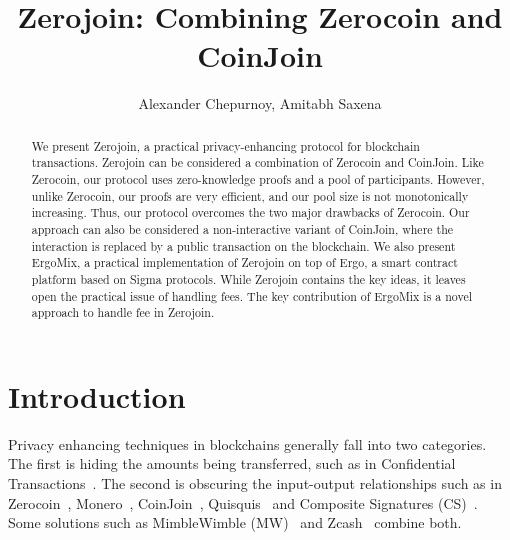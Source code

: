 \documentclass[runningheads]{llncs}
\newcommand{\mixname}{ErgoMix\xspace}
\newcommand{\zerocoin}{Zerocoin\xspace}
\begin{document}
\newcommand{\algname}{Zerojoin\xspace}
\title{\algname: Combining \zerocoin and CoinJoin}

\author{Alexander Chepurnoy, Amitabh Saxena}


\maketitle

\begin{abstract}

We present \algname, a practical privacy-enhancing protocol for blockchain transactions. \algname can be considered a combination of \zerocoin and CoinJoin. 
Like \zerocoin, our protocol uses zero-knowledge proofs and a pool of
participants. However, unlike \zerocoin, our proofs are very efficient, and our pool size is not monotonically increasing.
Thus, our protocol overcomes the two major drawbacks of \zerocoin. Our approach can also be considered a non-interactive variant of CoinJoin, where the interaction is replaced by a public transaction on the blockchain. We also present \mixname, a practical implementation of \algname on top of Ergo, a smart contract platform based on Sigma protocols. While \algname contains the key ideas, it leaves open the practical issue of handling fees. The key contribution of \mixname is a novel approach to handle fee in \algname. 

\end{abstract}

\section{Introduction}
\label{intro}

Privacy enhancing techniques in blockchains generally fall into two categories. The first is hiding the amounts being transferred, such as in Confidential Transactions~\cite{ct}. The second is obscuring the input-output relationships such as in \zerocoin~\cite{zerocoin}, Monero~\cite{monero}, CoinJoin~\cite{coinjoin}, Quisquis~\cite{quisquis} and Composite Signatures (CS)~\cite{composite}. Some solutions such as MimbleWimble (MW)~\cite{mw} and Zcash~\cite{zcash,zcash1} combine both.
\end{document}
